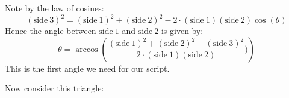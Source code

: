 \documentclass[noauthor,nooutcomes,handout,hints]{ximera}
\begin{document}
\begin{question}
\begin{freeResponse}
\begin{enumerate}
\begin{center}
        \end{center}
        Note by the law of cosines:
        \[
        (\mathrm{side~3})^2 = (\mathrm{side~1})^2 + (\mathrm{side~2})^2 - 2\cdot (\mathrm{side~1})(\mathrm{side~2})\cos(\theta)
        \]
        Hence the angle between $\mathrm{side~1}$ and $\mathrm{side~2}$ is given by:
        \[
        \theta = \arccos\left(\frac{(\mathrm{side~1})^2 + (\mathrm{side~2})^2- (\mathrm{side~3})^2}{2\cdot (\mathrm{side~1})(\mathrm{side~2})})\right) 
        \]
        This is the first angle we need for our script.
        
        Now consider this triangle:
        \begin{center}
\end{center}
\end{enumerate}
\end{freeResponse}
\end{question}
\end{document}
